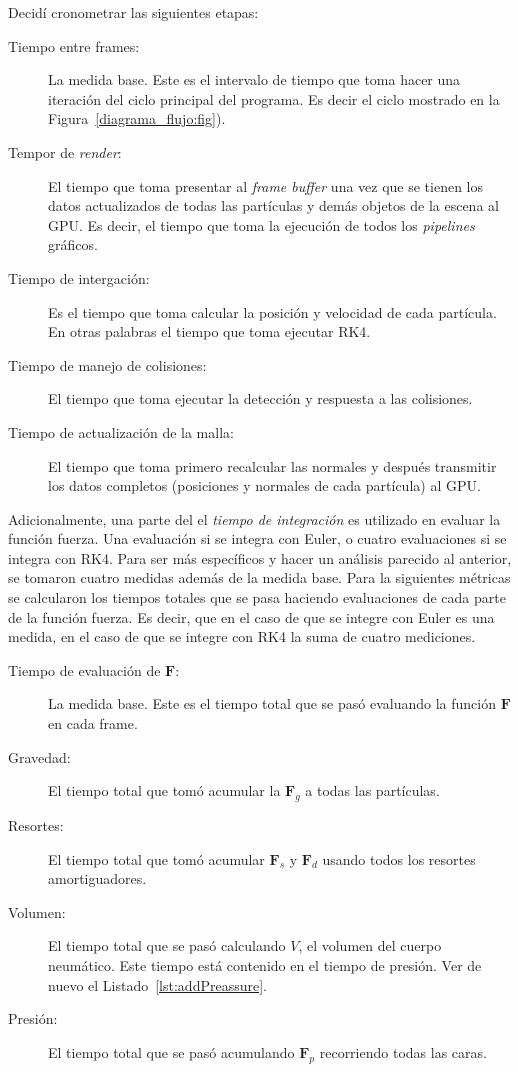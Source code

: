 Decidí cronometrar las siguientes etapas:
\begin{description}
 \item[Tiempo entre frames:] La medida base. Este es el intervalo  de tiempo que toma hacer una iteración del ciclo principal del programa. Es decir el ciclo mostrado en la Figura~\ref{diagrama_flujo:fig}).
 \item[Tempor de \emph{\textenglish{render}}:] El tiempo que toma presentar al \emph{\textenglish{frame buffer}} una vez que se tienen los datos actualizados de todas las partículas y demás objetos de la escena al GPU. Es decir, el tiempo que toma la ejecución de todos los \emph{\textenglish{pipelines}} gráficos.
 \item[Tiempo de intergación:] Es el tiempo que toma calcular la posición y velocidad de cada partícula. En otras palabras el tiempo que toma ejecutar RK4.
 \item[Tiempo de manejo de colisiones:] El tiempo que toma ejecutar la detección y respuesta a las colisiones.
 \item[Tiempo de actualización de la malla:] El tiempo que toma primero recalcular las normales y después transmitir los datos completos (posiciones y normales de cada partícula) al GPU.
\end{description}

Adicionalmente, una parte del el \emph{tiempo de integración} es utilizado en evaluar la función fuerza.
Una evaluación si se integra con Euler, o cuatro evaluaciones si se integra con RK4.
Para ser más específicos y hacer un análisis parecido al anterior, se tomaron cuatro medidas además de la medida base.
Para la siguientes métricas se calcularon los tiempos totales que se pasa haciendo evaluaciones de cada parte de la función fuerza.
Es decir, que en el caso de que se integre con Euler es una medida, en el caso de que se integre con RK4 la suma de cuatro mediciones.

\begin{description}
 \item[Tiempo de evaluación de $\textbf{F}$:] La medida base. Este es el tiempo total que se pasó evaluando la función $\textbf{F}$ en cada frame.
 \item[Gravedad:] El tiempo total que tomó acumular la $\textbf{F}_g$ a todas las partículas.
 \item[Resortes:] El tiempo total que tomó acumular $\textbf{F}_s$ y $\textbf{F}_d$ usando todos los resortes amortiguadores.
 \item[Volumen:] El tiempo total que se pasó calculando $V$, el volumen del cuerpo neumático. Este tiempo está contenido en el tiempo de presión. Ver de nuevo el Listado~\ref{lst:addPreassure}.
 \item[Presión:] El tiempo total que se pasó acumulando $\textbf{F}_p$ recorriendo todas las caras.
\end{description}


